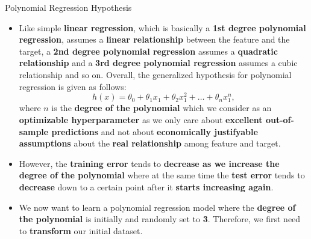 \documentclass[document.tex]{subfiles}
\begin{document}
    \begin{frame}{Polynomial Regression Hypothesis}
        \begin{itemize}
            \item Like simple \textbf{linear regression}, which is basically a \textbf{1st degree polynomial regression}, assumes a \textbf{linear relationship} between the feature and the target, a \textbf{2nd degree polynomial regression} assumes a \textbf{quadratic relationship} and a \textbf{3rd degree polynomial regression} assumes a cubic relationship and so on. Overall, the generalized hypothesis for polynomial regression is given as follows:
            $$h(x) = \theta_0 + \theta_1x_1 + \theta_2x_1^2 + \dots + \theta_nx_1^n,$$
            where $n$ is the \textbf{degree of the polynomial} which we consider as an \textbf{optimizable hyperparameter} as we only care about \textbf{excellent out-of-sample predictions} and not about \textbf{economically justifyable assumptions} about the \textbf{real relationship} among feature and target.
            \item However, the \textbf{training error} tends to \textbf{decrease as we increase the degree of the polynomial} where at the same time the \textbf{test error} tends to \textbf{decrease} down to a certain point after it \textbf{starts increasing again}.
            \item We now want to learn a polynomial regression model where the \textbf{degree of the polynomial} is initially and randomly set to \textbf{3}. Therefore, we first need to \textbf{transform} our initial dataset.
        \end{itemize}
    \end{frame}
\end{document}
